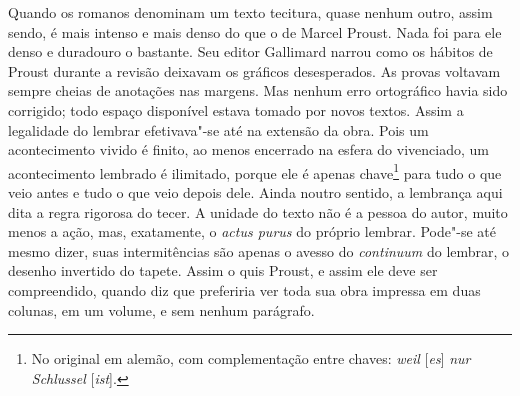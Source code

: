 Quando os romanos denominam um texto tecitura, quase nenhum outro, assim
sendo, é mais intenso e mais denso do que o de Marcel Proust. Nada foi
para ele denso e duradouro o bastante. Seu editor Gallimard narrou como
os hábitos de Proust durante a revisão deixavam os gráficos
desesperados. As provas voltavam sempre cheias de anotações nas margens.
Mas nenhum erro ortográfico havia sido corrigido; todo espaço disponível
estava tomado por novos textos. Assim a legalidade do lembrar
efetivava"-se até na extensão da obra. Pois um acontecimento vivido é
finito, ao menos encerrado na esfera do vivenciado, um acontecimento
lembrado é ilimitado, porque ele é apenas chave\footnote{No
  original em alemão, com complementação entre chaves: \emph{weil} {[}\emph{es}{]} \emph{nur Schlussel} {[}\emph{ist}{]}. \versal{[N.~T.]}} para tudo o que veio antes e tudo o que veio
depois dele. Ainda noutro sentido, a lembrança aqui dita a regra
rigorosa do tecer. A unidade do texto não é a pessoa do autor, muito
menos a ação, mas, exatamente, o \emph{actus purus} do próprio lembrar.
Pode"-se até mesmo dizer, suas intermitências são apenas o avesso
do \emph{continuum} do lembrar, o desenho invertido do tapete. Assim o
quis Proust, e assim ele deve ser compreendido, quando diz que
preferiria ver toda sua obra impressa em duas colunas, em um volume, e
sem nenhum parágrafo.

